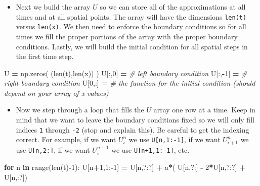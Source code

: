 \documentclass[
]{book}
\newenvironment{Shaded}{\begin{snugshade}}{\end{snugshade}}
\newcommand{\BuiltInTok}[1]{#1}
\newcommand{\CommentTok}[1]{\textcolor[rgb]{0.56,0.35,0.01}{\textit{#1}}}
\newcommand{\ControlFlowTok}[1]{\textcolor[rgb]{0.13,0.29,0.53}{\textbf{#1}}}
\newcommand{\DecValTok}[1]{\textcolor[rgb]{0.00,0.00,0.81}{#1}}
\newcommand{\KeywordTok}[1]{\textcolor[rgb]{0.13,0.29,0.53}{\textbf{#1}}}
\newcommand{\NormalTok}[1]{#1}
\newcommand{\OperatorTok}[1]{\textcolor[rgb]{0.81,0.36,0.00}{\textbf{#1}}}
\providecommand{\tightlist}{%
  \setlength{\itemsep}{0pt}\setlength{\parskip}{0pt}}
\theoremstyle{definition}
\theoremstyle{definition}
\theoremstyle{definition}
\theoremstyle{remark}
\begin{document}
\begin{itemize}
\tightlist
\item
  Next we build the array \(U\) so we can store all of the approximations at all times and at all spatial points. The array will have the dimensions \texttt{len(t)} versus \texttt{len(x)}. We then need to enforce the boundary conditions so for all times we fill the proper portions of the array with the proper boundary conditions. Lastly, we will build the initial condition for all spatial steps in the first time step.
\end{itemize}

\begin{Shaded}
\begin{Highlighting}[]
\NormalTok{U }\OperatorTok{=}\NormalTok{ np.zeros( (}\BuiltInTok{len}\NormalTok{(t),}\BuiltInTok{len}\NormalTok{(x)) )}
\NormalTok{U[:,}\DecValTok{0}\NormalTok{] }\OperatorTok{=} \CommentTok{\# left boundary condition}
\NormalTok{U[:,}\OperatorTok{{-}}\DecValTok{1}\NormalTok{] }\OperatorTok{=} \CommentTok{\# right boundary condition}
\NormalTok{U[}\DecValTok{0}\NormalTok{,:] }\OperatorTok{=} \CommentTok{\# the function for the initial condition (should depend on your array of x values)}
\end{Highlighting}
\end{Shaded}

\begin{itemize}
\tightlist
\item
  Now we step through a loop that fills the \(U\) array one row at a time. Keep in mind that we want to leave the boundary conditions fixed so we will only fill indices \texttt{1} through \texttt{-2} (stop and explain this). Be careful to get the indexing correct. For example, if we want \(U_i^n\) we use \texttt{U{[}n,1:-1{]}}, if we want \(U_{i+1}^n\) we use \texttt{U{[}n,2:{]}}, if we want \(U_i^{n+1}\) we use \texttt{U{[}n+1,1:-1{]}}, etc.
\end{itemize}

\begin{Shaded}
\begin{Highlighting}[]
\ControlFlowTok{for}\NormalTok{ n }\KeywordTok{in} \BuiltInTok{range}\NormalTok{(}\BuiltInTok{len}\NormalTok{(t)}\OperatorTok{{-}}\DecValTok{1}\NormalTok{):}
\NormalTok{    U[n}\OperatorTok{+}\DecValTok{1}\NormalTok{,}\DecValTok{1}\NormalTok{:}\OperatorTok{{-}}\DecValTok{1}\NormalTok{] }\OperatorTok{=}\NormalTok{ U[n,?:?] }\OperatorTok{+}\NormalTok{ a}\OperatorTok{*}\NormalTok{( U[n,?:] }\OperatorTok{{-}} \DecValTok{2}\OperatorTok{*}\NormalTok{U[n,?:?] }\OperatorTok{+}\NormalTok{ U[n,:?])}
\end{Highlighting}
\end{Shaded}
\end{document}
